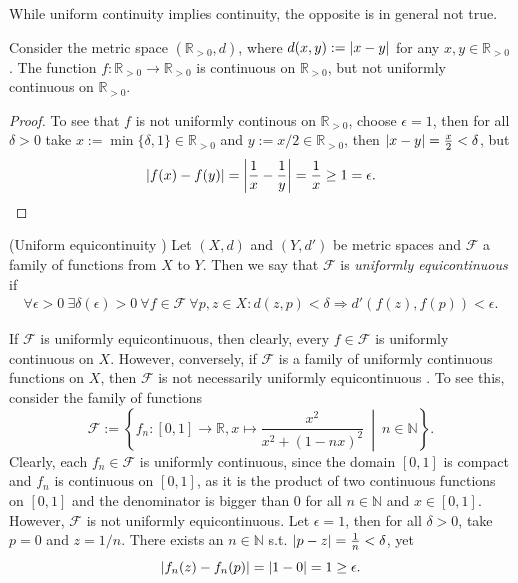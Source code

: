 \begin{remark}
	While uniform continuity implies continuity, the opposite is in general not true.
\end{remark}

\begin{exmp}
	Consider the metric space $(\mathbb R_{> 0}, d)$, where $d(x, y) := \left\vert x - y \right\vert$ for any $x, y\in\mathbb R_{> 0}$. The function $f: \mathbb R_{>0} \to \mathbb R_{> 0}$ is continuous on $\mathbb R_{> 0}$, but not uniformly continuous on $\mathbb R_{> 0}$. 
\end{exmp}

\begin{proof}
	To see that $f$ is not uniformly continous on $\mathbb R_{> 0}$, choose $\epsilon = 1$, then for all $\delta > 0$ take $x := \min\{\delta, 1\}\in\mathbb R_{> 0}$ and $y := x/2\in\mathbb R_{> 0}$, then $\left\vert x - y \right\vert = \frac{x}{2} < \delta$, but
	$$\left\vert f(x) - f(y) \right\vert = \left\vert \frac{1}{x} - \frac{1}{y} \right\vert = \frac{1}{x} \geq 1 = \epsilon.$$
\end{proof}

\begin{defn}(Uniform equicontinuity \cite{1674834})
	Let $(X, d)$ and $(Y, d')$ be metric spaces and $\mathscr F$ a family of functions from $X$ to $Y$. Then we say that $\mathscr F$ is \textit{uniformly equicontinuous} if 
	\begin{align}
		\forall \epsilon > 0\ \exists \delta(\epsilon) > 0\ \forall f\in \mathscr F\ \forall p, z\in X: d(z, p) < \delta \Rightarrow d'(f(z), f(p)) < \epsilon.
	\end{align}
\end{defn}

\begin{remark}
	If $\mathscr F$ is uniformly equicontinuous, then clearly, every $f\in \mathscr F$ is uniformly continuous on $X$. However, conversely, if $\mathscr F$ is a family of uniformly continuous functions on $X$, then $\mathscr F$ is not necessarily uniformly equicontinuous \cite{4841004}. To see this, consider the family of functions 
	\[
		\mathscr F := \left\{ f_n: [0, 1]\to\mathbb R, x\mapsto \frac{x^2}{x^2 + (1 - nx)^2}\ \middle|\ n\in\mathbb N \right\}.
	\]
	Clearly, each $f_n\in\mathscr F$ is uniformly continuous, since the domain $[0, 1]$ is compact and $f_n$ is continuous on $[0, 1]$, as it is the product of two continuous functions on $[0, 1]$ and the denominator is bigger than $0$ for all $n\in\mathbb N$ and $x\in [0, 1]$. However, $\mathscr F$ is not uniformly equicontinuous. Let $\epsilon = 1$, then for all $\delta > 0$, take $p = 0$ and $z = 1/n$. There exists an $n\in\mathbb N$ s.t. $\left\vert p - z \right\vert = \frac{1}{n} < \delta$, yet
	\[
		\left\vert f_n(z) - f_n(p) \right\vert = \left\vert 1 - 0 \right\vert = 1 \geq \epsilon.
	\]
\end{remark}

